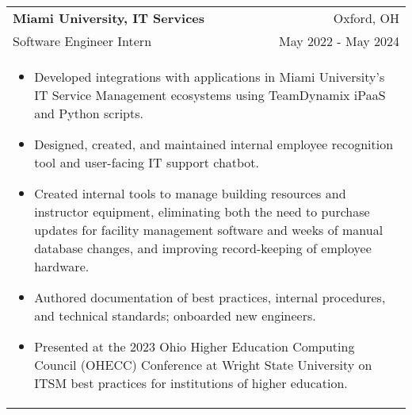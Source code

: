 \documentclass[letterpaper,10pt]{article} %
\begin{document}
\begin{tabular*}{\linewidth}{@{\extracolsep{\fill}} lr }
\textbf{Miami University, IT Services} & \footnotesize{Oxford, OH}\\
\footnotesize{Software Engineer Intern} & \footnotesize{May 2022 - May 2024}\\
\multicolumn{2}{p{\linewidth}}{
    \scriptsize{\vspace{-3.25mm}\begin{itemize}
        \item Developed integrations with applications in Miami University's IT Service Management ecosystems using TeamDynamix iPaaS and Python scripts.
        \item Designed, created, and maintained internal employee recognition tool and user-facing IT support chatbot.
        \item Created internal tools to manage building resources and instructor equipment, eliminating both the need to purchase updates for facility management software and weeks of manual database changes, and improving record-keeping of employee hardware.
        \item Authored documentation of best practices, internal procedures, and technical standards; onboarded new engineers.
        \item Presented at the 2023 Ohio Higher Education Computing Council (OHECC) Conference at Wright State University on ITSM best practices for institutions of higher education.
    \end{itemize}}
}\\


\end{tabular*}
\end{document}
